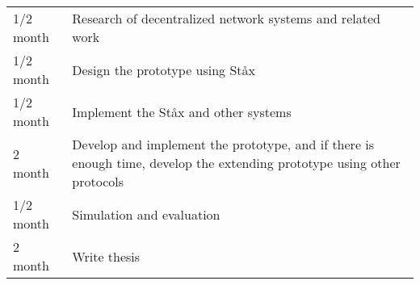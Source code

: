 \begin{table} [h]
	\centering
	\begin{tabular}{ p{2cm} p{13cm} }
		1/2 month & Research of decentralized network systems and related work \\
		1/2 month & Design the prototype using St\aa x \\
		1/2 month & Implement the St\aa x and other systems \\
		2 month & Develop and implement the prototype, and if there is enough time, develop the extending prototype using other protocols \\
		1/2 month & Simulation and evaluation \\
		2 month & Write thesis \\
	\end{tabular}
\end{table}




